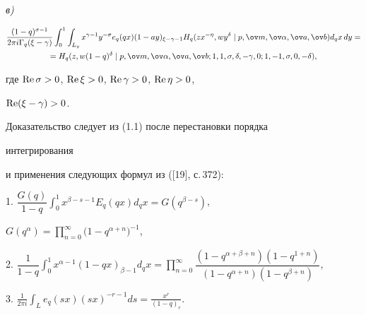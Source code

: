 \begin{thms}
 


{\em в)} 


\begin{multline*} 


\frac{(1-q)^{\sigma-1}}{2\pi i\Gamma_q(\xi-\gamma)} 


\int^1_0\int_{L_y}x^{\gamma-1}y^{-\sigma}e_q(q x) 


(1-a y)_{\xi-\gamma-1}H_q(z x^{-\eta},w y^\delta\mid 


p,\ov m,\ov\alpha,\ov a,\ov b)d_q x\,dy=\\ 


% 


=H_q(z,w(1-q)^\delta\mid p,\ov m,\ov\alpha,\ov a,\ov b; 


1,1,\sigma,\delta,-\gamma,0;1,-1,\sigma,0,-\delta), 


\end{multline*} 


где $\operatorname{Re}\sigma>0$, $\operatorname{Re}\xi>0$, $\operatorname{Re}\gamma>0$, $\operatorname{Re}\eta>0$, 


$\operatorname{Re}(\xi-\gamma)>0$. 


\end{thms} 


 


Доказательство следует из (1.1) после перестановки порядка 


интегрирования 


и применения следующих формул из ([19], с.\,372): 


 


1. $\dfrac{G(q)}{1-q}\displaystyle{\int^1_0 x^{\beta-s-1} 


E_q(q x)d_q x=G(q^{\beta-s})}$, 


$\displaystyle{G(q^\alpha)=\prod^\infty_{n=0} (1-q^{\alpha+n}})^{-1}$, 


 


2. $\displaystyle{\dfrac{1}{1-q}\int^1_0 x^{\alpha-1}(1-q x)_{\beta-1} 


d_q x=\prod^\infty_{n=0} 


\dfrac{(1-q^{\alpha+\beta+n})(1-q^{1+n})} 


{(1-q^{\alpha+n})(1-q^{\beta+n})}}$, 


 


3. $\displaystyle{\frac{1}{2\pi i}\int_L e_q(s x)(s x)^{-r-1}ds= 


\frac{x^r}{(1-q)_r}}$. 


